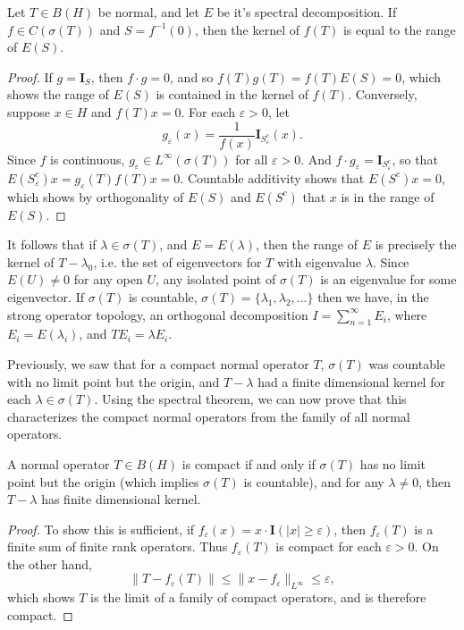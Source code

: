 \begin{theorem}
    Let $T \in B(H)$ be normal, and let $E$ be it's spectral decomposition. If $f \in C(\sigma(T))$ and $S = f^{-1}(0)$, then the kernel of $f(T)$ is equal to the range of $E(S)$.
\end{theorem}
\begin{proof}
    If $g = \mathbf{I}_S$, then $f \cdot g = 0$, and so $f(T) g(T) = f(T) E(S) = 0$, which shows the range of $E(S)$ is contained in the kernel of $f(T)$. Conversely, suppose $x \in H$ and $f(T) x = 0$. For each $\varepsilon > 0$, let
    \[ g_\varepsilon(x) = \frac{1}{f(x)} \mathbf{I}_{S_\varepsilon^c}(x). \]
    Since $f$ is continuous, $g_\varepsilon \in L^\infty(\sigma(T))$ for all $\varepsilon > 0$. And $f \cdot g_\varepsilon = \mathbf{I}_{S_\varepsilon^c}$, so that $E(S_\varepsilon^c) x = g_\varepsilon(T) f(T) x = 0$. Countable additivity shows that $E(S^c) x = 0$, which shows by orthogonality of $E(S)$ and $E(S^c)$ that $x$ is in the range of $E(S)$.
\end{proof}

It follows that if $\lambda \in \sigma(T)$, and $E = E(\lambda)$, then the range of $E$ is precisely the kernel of $T - \lambda_0$, i.e. the set of eigenvectors for $T$ with eigenvalue $\lambda$. Since $E(U) \neq 0$ for any open $U$, any isolated point of $\sigma(T)$ is an eigenvalue for some eigenvector. If $\sigma(T)$ is countable, $\sigma(T) = \{ \lambda_1, \lambda_2, \dots \}$ then we have, in the strong operator topology, an orthogonal decomposition $I = \sum_{n = 1}^\infty E_i$, where $E_i = E(\lambda_i)$, and $TE_i = \lambda E_i$.

Previously, we saw that for a compact normal operator $T$, $\sigma(T)$ was countable with no limit point but the origin, and $T - \lambda$ had a finite dimensional kernel for each $\lambda \in \sigma(T)$. Using the spectral theorem, we can now prove that this characterizes the compact normal operators from the family of all normal operators.

\begin{theorem}
    A normal operator $T \in B(H)$ is compact if and only if $\sigma(T)$ has no limit point but the origin (which implies $\sigma(T)$ is countable), and for any $\lambda \neq 0$, then $T - \lambda$ has finite dimensional kernel.
\end{theorem}
\begin{proof}
    To show this is sufficient, if $f_\varepsilon(x) = x \cdot \mathbf{I}(|x| \geq \varepsilon)$, then $f_\varepsilon(T)$ is a finite sum of finite rank operators. Thus $f_\varepsilon(T)$ is compact for each $\varepsilon > 0$. On the other hand,
    \[ \| T - f_\varepsilon(T) \| \leq \| x - f_\varepsilon \|_{L^\infty} \leq \varepsilon, \]
    which shows $T$ is the limit of a family of compact operators, and is therefore compact.
\end{proof}

